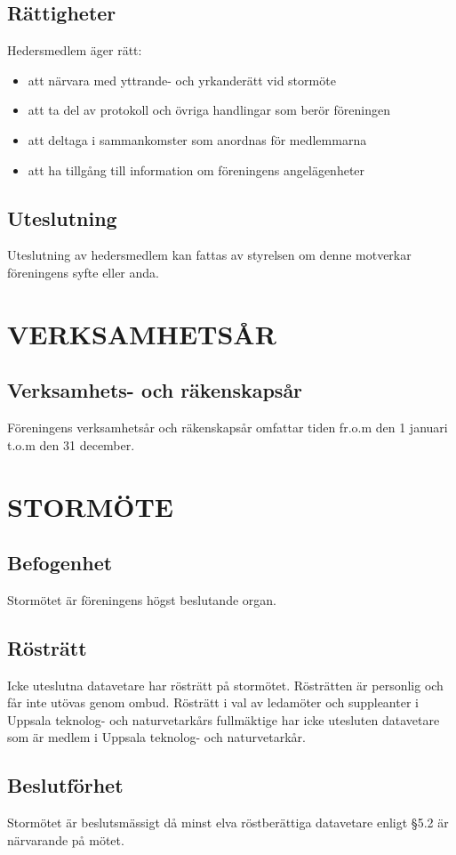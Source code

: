 \documentclass[a4paper]{article}
\begin{document}
{{    \subsection{Rättigheter}
    Hedersmedlem äger rätt:
    \begin{itemize}
    \item att närvara med yttrande- och yrkanderätt vid stormöte
    \item att ta del av protokoll och övriga handlingar som berör föreningen
    \item att deltaga i sammankomster som anordnas för medlemmarna
    \item att ha tillgång till information om föreningens angelägenheter
    \end{itemize}
    \subsection{Uteslutning}
    Uteslutning av hedersmedlem kan fattas av styrelsen om denne motverkar föreningens syfte eller anda.}
  \section{VERKSAMHETSÅR}
  {\subsection{Verksamhets- och räkenskapsår}
    Föreningens verksamhetsår och räkenskapsår omfattar tiden fr.o.m den 1 januari t.o.m den 31 december.}
  \section{STORMÖTE}
  {\subsection{Befogenhet}
  Stormötet är föreningens högst beslutande organ.
  \subsection{Rösträtt}
  Icke uteslutna datavetare har rösträtt på stormötet. Rösträtten är personlig och får inte utövas genom ombud. Rösträtt i val av ledamöter och suppleanter i Uppsala teknolog- och naturvetarkårs fullmäktige har icke utesluten datavetare som är
  medlem i Uppsala teknolog- och naturvetarkår.
  \subsection{Beslutförhet}
  Stormötet är beslutsmässigt då minst elva röstberättiga datavetare enligt §5.2 är närvarande på mötet.
}}
\end{document}
